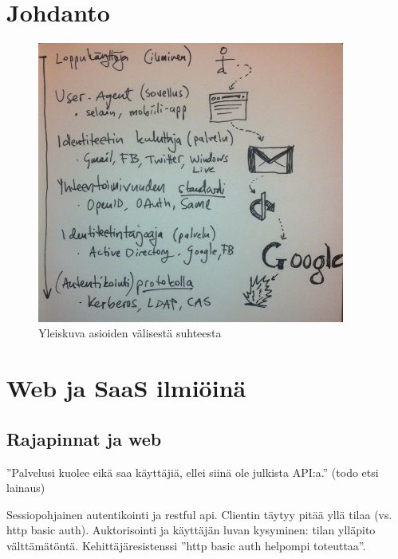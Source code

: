 \documentclass[finnish,gradu]{tktltiki}
\begin{document}
\setcounter{tocdepth}{3}
\mytableofcontents

\section{Johdanto} %
\label{sec:johdanto}

  \begin{figure}
    \centering
    \includegraphics[width=0.9\textwidth]{images/auth_yleiskuva.jpg}
    \caption{Yleiskuva asioiden välisestä suhteesta}
    \label{fig:yleiskuva}
  \end{figure}



\section{Web ja SaaS ilmiöinä} %
\label{sec:web_ja_saas}
  \subsection{Rajapinnat ja web} %
  \label{sub:rajapinnat_ja_web}

  ''Palvelusi kuolee eikä saa käyttäjiä, ellei siinä ole julkista API:a.'' (todo etsi lainaus)

  Sessiopohjainen autentikointi ja restful api. Clientin täytyy pitää yllä tilaa (vs. http basic auth).
  Auktorisointi ja käyttäjän luvan kysyminen: tilan ylläpito välttämätöntä. Kehittäjäresistenssi ''http basic auth helpompi toteuttaa''.
\end{document}
